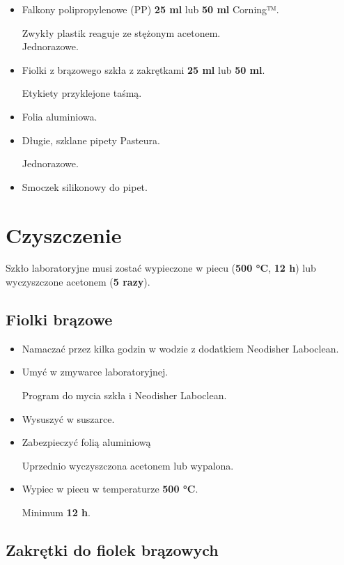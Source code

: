 \documentclass[
  letterpaper,
  DIV=11,
  numbers=noendperiod]{scrreprt}
\begin{document}
\begin{itemize}
\item
  Falkony polipropylenowe (PP) \textbf{25 ml} lub \textbf{50 ml}
  Corning™.

  Zwykły plastik reaguje ze stężonym acetonem.\\
  Jednorazowe.
\item
  Fiolki z brązowego szkła z zakrętkami \textbf{25 ml} lub \textbf{50
  ml}.

  Etykiety przyklejone taśmą.
\item
  Folia aluminiowa.
\item
  Długie, szklane pipety Pasteura.

  Jednorazowe.
\item
  Smoczek silikonowy do pipet.
\end{itemize}

\hypertarget{czyszczenie-1}{%
\section{Czyszczenie}\label{czyszczenie-1}}

Szkło laboratoryjne musi zostać wypieczone w piecu (\textbf{500 °C},
\textbf{12 h}) lub wyczyszczone acetonem (\textbf{5 razy}).

\hypertarget{fiolki-brux105zowe}{%
\subsection{Fiolki brązowe}\label{fiolki-brux105zowe}}

\begin{itemize}
\item
  Namaczać przez kilka godzin w wodzie z dodatkiem Neodisher Laboclean.
\item
  Umyć w zmywarce laboratoryjnej.

  Program do mycia szkła i Neodisher Laboclean.
\item
  Wysuszyć w suszarce.
\item
  Zabezpieczyć folią aluminiową

  Uprzednio wyczyszczona acetonem lub wypalona.
\item
  Wypiec w piecu w temperaturze \textbf{500 °C}.

  Minimum \textbf{12 h}.
\end{itemize}

\hypertarget{zakrux119tki-do-fiolek-brux105zowych}{%
\subsection{Zakrętki do fiolek
brązowych}\label{zakrux119tki-do-fiolek-brux105zowych}}
\end{document}

